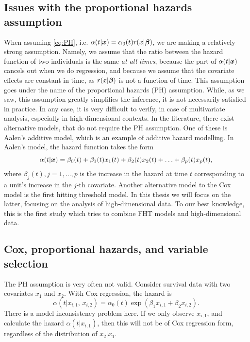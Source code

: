 \subsection{Issues with the proportional hazards assumption}
When assuming \eqref{eq:PH}, i.e. $\alpha(t|\bm{x})=\alpha_0(t)r(x|\boldsymbol{\beta})$, we are making a relatively strong assumption.
Namely, we assume that the ratio between the hazard function of two individuals is the same \textit{at all times}, because the part of $\alpha(t|\bm{x})$ cancels out when we do regression, and because we assume that the covariate effects are constant in time, as $r(x|\boldsymbol{\beta})$ is not a function of time.
This assumption goes under the name of the proportional hazards (PH) assumption.
While, as we saw, this assumption greatly simplifies the inference, it is not necessarily satisfied in practice.
In any case, it is very difficult to verify, in case of multivariate analysis, especially in high-dimensional contexts.
In the literature, there exist alternative models, that do not require the PH assumption.
One of these is Aalen's additive model, which is an example of additive hazard modelling.
In Aalen's model, the hazard function takes the form
\begin{equation}
    \alpha(t|\bm{x})=\beta_0(t)+\beta_1(t)x_1(t)+\beta_2(t)x_2(t)+\ldots+\beta_p(t)x_p(t),
\end{equation}
where $\beta_j(t),j=1,\ldots,p$ is the increase in the hazard at time $t$ corresponding to a unit's increase in the $j$-th covariate. Another alternative model to the Cox model is the first hitting threshold model.
In this thesis we will focus on the latter, focusing on the analysis of high-dimensional data.
To our best knowledge, this is the first study which tries to combine FHT models and high-dimensional data.

\subsection{Cox, proportional hazards, and variable selection}
The PH assumption is very often not valid.
Consider survival data with two covariates $x_1$ and $x_2$.
With Cox regression, the hazard is
\begin{equation*}
    \alpha(t|x_{i,1},\,x_{i,2})=\alpha_0(t)\exp(\beta_1x_{i,1}+\beta_2x_{i,2}).
\end{equation*}
There is a model inconsistency problem here.
If we only observe $x_{i,1}$, and calculate the hazard $\alpha(t|x_{i,1})$, then this will not be of Cox regression form, regardless of the distribution of $x_2|x_1$.

